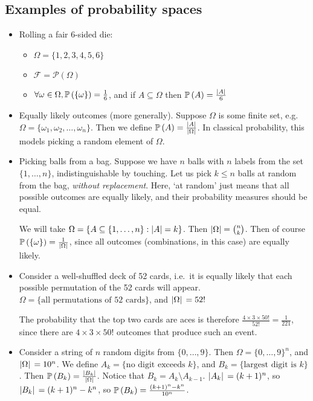 \subsection{Examples of probability spaces}
\begin{itemize}
	\item Rolling a fair 6-sided die:
	      \begin{itemize}
		      \item \(\Omega = \{ 1, 2, 3, 4, 5, 6 \}\)
		      \item \(\mathcal F = \mathcal P(\Omega)\)
		      \item \(\forall \omega \in \Omega, \mathbb{P}\left({\{ \omega \}}\right) = \frac{1}{6}\), and if \(A \subseteq \Omega\) then \(\mathbb{P}\left({A}\right) = \frac{\abs{A}}{6}\)
	      \end{itemize}

	\item Equally likely outcomes (more generally).
	      Suppose \(\Omega\) is some finite set, e.g.
	      \(\Omega = \{ \omega_1, \omega_2, \dots, \omega_n \}\).
	      Then we define \(\mathbb{P}\left({A}\right) = \frac{\abs{A}}{\abs{\Omega}}\).
	      In classical probability, this models picking a random element of \(\Omega\).

	\item Picking balls from a bag.
	      Suppose we have \(n\) balls with \(n\) labels from the set \(\{1, \dots, n\}\), indistinguishable by touching.
	      Let us pick \(k \leq n\) balls at random from the bag, \textit{without replacement}.
	      Here, `at random' just means that all possible outcomes are equally likely, and their probability measures should be equal.

	      We will take \(\Omega = \{ A \subseteq \{1, \dots, n\} : \abs{A} = k \}\).
	      Then \(\abs{\Omega} = \binom{n}{k}\).
	      Then of course \(\mathbb{P}\left({\{ \omega \}}\right) = \frac{1}{\abs*{\Omega}}\), since all outcomes (combinations, in this case) are equally likely.

	\item Consider a well-shuffled deck of 52 cards, i.e.\ it is equally likely that each possible permutation of the 52 cards will appear.
	      \(\Omega = \{ \text{all permutations of 52 cards} \}\), and \(\abs*{\Omega} = 52!
	      \)

	      The probability that the top two cards are aces is therefore \(\frac{4 \times 3 \times 50!}{52!} = \frac{1}{221}\), since there are \(4 \times 3 \times 50!
	      \) outcomes that produce such an event.

	\item Consider a string of \(n\) random digits from \(\{0, \dots, 9\}\).
	      Then \(\Omega = \{ 0, \dots, 9 \}^n\), and \(\abs*{\Omega} = 10^n\).
	      We define \(A_k = \{ \text{no digit exceeds } k \}\), and \(B_k = \{ \text{largest digit is } k \}\).
	      Then \(\mathbb{P}\left({B_k}\right) = \frac{\abs*{B_k}}{\abs*{\Omega}}\).
	      Notice that \(B_k = A_k \setminus A_{k-1}\).
	      \(\abs*{A_k} = (k+1)^n\), so \(\abs*{B_k} = (k+1)^n - k^n\), so \(\mathbb{P}\left({B_k}\right) = \frac{(k+1)^n - k^n}{10^n}\).


\end{itemize}
